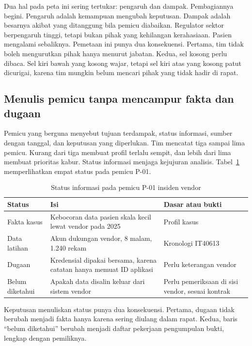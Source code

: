 Dua hal pada peta ini sering tertukar: pengaruh dan dampak. Pembagiannya begini. Pengaruh
adalah kemampuan mengubah keputusan. Dampak adalah besarnya akibat yang ditanggung bila pemicu
diabaikan. Regulator sektor berpengaruh tinggi, tetapi bukan pihak yang kehilangan
kerahasiaan. Pasien mengalami sebaliknya. Pemetaan ini punya dua konsekuensi. Pertama, tim
tidak boleh mengurutkan pihak hanya menurut jabatan. Kedua, sel kosong perlu dibaca. Sel
kiri bawah yang kosong wajar, tetapi sel kiri atas yang kosong patut dicurigai, karena tim
mungkin belum mencari pihak yang tidak hadir di rapat.

\subsection*{Menulis pemicu tanpa mencampur fakta dan dugaan}

Pemicu yang berguna menyebut tujuan terdampak, status informasi, sumber dengan tanggal, dan
keputusan yang diperlukan. Tim mencatat tiga sampai lima pemicu. Kurang dari tiga membuat
profil terlalu sempit, dan lebih dari lima membuat prioritas kabur. Status informasi menjaga
kejujuran analisis. Tabel~\ref{tab:ch01-status} memperlihatkan empat status pada pemicu P-01.

\begin{table}[!htb]
  \centering\small
  \caption{Status informasi pada pemicu P-01 insiden vendor}\label{tab:ch01-status}
  \begin{tabularx}{\textwidth}{|>{\raggedright\arraybackslash}p{}|>{\raggedright\arraybackslash}X|>{\raggedright\arraybackslash}p{}|}
    \hline
    \textbf{Status} & \textbf{Isi} & \textbf{Dasar atau bukti} \\ \hline
    Fakta kasus & Kebocoran data pasien skala kecil lewat vendor pada 2025 & Profil kasus \\
    \hline
    Data latihan & Akun dukungan vendor, 8 malam, 1.240 rekam & Kronologi IT40613 \\ \hline
    Dugaan & Kredensial dipakai bersama, karena catatan hanya memuat ID aplikasi &
    Perlu keterangan vendor \\ \hline
    Belum diketahui & Apakah data disalin keluar dari sistem vendor & Perlu pemeriksaan di
    sisi vendor, sesuai kontrak \\ \hline
  \end{tabularx}
\end{table}

Keputusan menuliskan status punya dua konsekuensi. Pertama, dugaan tidak berubah menjadi
fakta hanya karena sering diulang dalam rapat. Kedua, baris ``belum diketahui'' berubah
menjadi daftar pekerjaan pengumpulan bukti, lengkap dengan pemiliknya.

